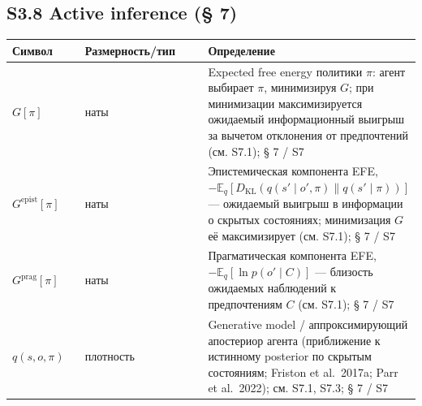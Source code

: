 \documentclass[pdflatex,sn-mathphys-ay]{sn-jnl}
\begin{document}
\subsection*{S3.8 Active inference (§ 7)}\label{s3.8-active-inference-7}



\begin{center}\small
\begin{tabular}{@{} >{\raggedright\arraybackslash}p{0.2105\linewidth} >{\raggedright\arraybackslash}p{0.4474\linewidth} >{\raggedright\arraybackslash}p{0.3421\linewidth}@{}}
\toprule

\begin{minipage}[b]{\linewidth}\raggedright

Символ

\end{minipage} & \begin{minipage}[b]{\linewidth}\raggedright

Размерность/тип

\end{minipage} & \begin{minipage}[b]{\linewidth}\raggedright

Определение

\end{minipage} \\

\midrule

\(G[\pi]\) & наты & Expected free energy политики \(\pi\): агент выбирает \(\pi\), минимизируя \(G\); при минимизации максимизируется ожидаемый информационный выигрыш за вычетом отклонения от предпочтений (см. S7.1); § 7 / S7 \\

\(G^{\text{epist}}[\pi]\) & наты & Эпистемическая компонента EFE, \(-\mathbb{E}_q[D_{\text{KL}}(q(s'\mid o',\pi)\|q(s'\mid\pi))]\) --- ожидаемый выигрыш в информации о скрытых состояниях; минимизация \(G\) её максимизирует (см. S7.1); § 7 / S7 \\

\(G^{\text{prag}}[\pi]\) & наты & Прагматическая компонента EFE, \(-\mathbb{E}_q[\ln p(o'\mid C)]\) --- близость ожидаемых наблюдений к предпочтениям \(C\) (см. S7.1); § 7 / S7 \\

\(q(s, o, \pi)\) & плотность & Generative model / аппроксимирующий апостериор агента (приближение к истинному posterior по скрытым состояниям; Friston et al.~2017a; Parr et al.~2022); см. S7.1, S7.3; § 7 / S7 \\


\end{tabular}
\end{center}
\end{document}
